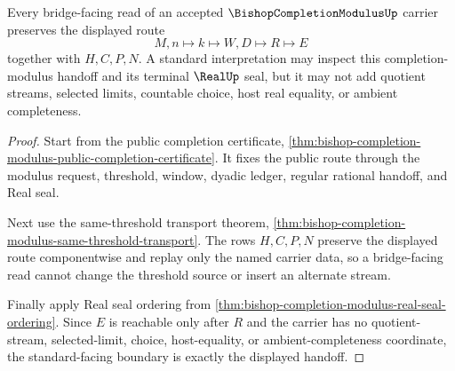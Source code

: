 \begin{theorem}
\label{thm:bishopcompletionmodulus-bridged-real-seal-boundary}
Every bridge-facing read of an accepted $\BishopCompletionModulusUp$ carrier preserves the displayed route
$$
M,n \longmapsto k \longmapsto W,D \longmapsto R \longmapsto E
$$
together with $H,C,P,N$. A standard interpretation may inspect this completion-modulus handoff and its terminal $\RealUp$ seal, but it may not add quotient streams, selected limits, countable choice, host real equality, or ambient completeness.
\end{theorem}
\begin{proof}
Start from the public completion certificate, \autoref{thm:bishop-completion-modulus-public-completion-certificate}. It fixes the public route through the modulus request, threshold, window, dyadic ledger, regular rational handoff, and Real seal.

Next use the same-threshold transport theorem, \autoref{thm:bishop-completion-modulus-same-threshold-transport}. The rows $H,C,P,N$ preserve the displayed route componentwise and replay only the named carrier data, so a bridge-facing read cannot change the threshold source or insert an alternate stream.

Finally apply Real seal ordering from \autoref{thm:bishop-completion-modulus-real-seal-ordering}. Since $E$ is reachable only after $R$ and the carrier has no quotient-stream, selected-limit, choice, host-equality, or ambient-completeness coordinate, the standard-facing boundary is exactly the displayed handoff.
\end{proof}


\begin{closurestatus}{\BishopCompletionModulusUp}
  \theoryclosure{\matureClosure}
  \formalstatus{\unformalizedV}
\end{closurestatus}

